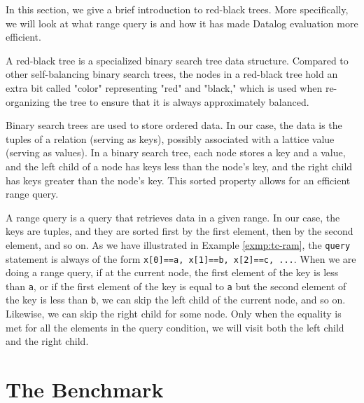 \documentclass[11pt]{report}
\theoremstyle{definition}
\begin{document}
In this section, we give a brief introduction to red-black trees. More specifically, we will look at what range query is and how it has made Datalog evaluation more efficient.

A red-black tree is a specialized binary search tree data structure. Compared to other self-balancing binary search trees, the nodes in a red-black tree hold an extra bit called "color" representing "red" and "black," which is used when re-organizing the tree to ensure that it is always approximately balanced.

Binary search trees are used to store ordered data. In our case, the data is the tuples of a relation (serving as keys), possibly associated with a lattice value (serving as values). In a binary search tree, each node stores a key and a value, and the left child of a node has keys less than the node's key, and the right child has keys greater than the node's key. This sorted property allows for an efficient range query.

A range query is a query that retrieves data in a given range. In our case, the keys are tuples, and they are sorted first by the first element, then by the second element, and so on. As we have illustrated in Example \ref{exmp:tc-ram}, the \texttt{query} statement is always of the form \texttt{x[0]==a, x[1]==b, x[2]==c, ...}. When we are doing a range query, if at the current node, the first element of the key is less than \texttt{a}, or if the first element of the key is equal to \texttt{a} but the second element of the key is less than \texttt{b}, we can skip the left child of the current node, and so on. Likewise, we can skip the right child for some node. Only when the equality is met for all the elements in the query condition, we will visit both the left child and the right child.

\section{The Benchmark}
\label{sec:benchmark}
\end{document}
